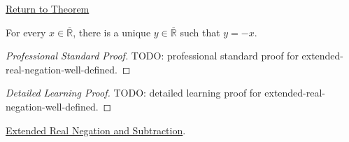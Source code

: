 \newpage
{}
\label{prf:extended-real-negation-well-defined}
\begin{remark*}[Return]
\hyperref[thm:extended-real-negation-well-defined]{Return to Theorem}
\end{remark*}
\begin{theorem*}
For every $x\in\overline{\mathbb{R}}$, there is a unique
$y\in\overline{\mathbb{R}}$ such that $y=-x$.
\end{theorem*}
\begin{proof}[Professional Standard Proof]
\LRAProofBodyStart
TODO: professional standard proof for extended-real-negation-well-defined.
\end{proof}
\begin{proof}[Detailed Learning Proof]
\LRAProofBodyStart
TODO: detailed learning proof for extended-real-negation-well-defined.
\end{proof}
\begin{remark*}
\end{remark*}
\begin{dependencies}
\hyperref[def:extended-real-negation]{Extended Real Negation and Subtraction}.
\end{dependencies}
\clearpage
